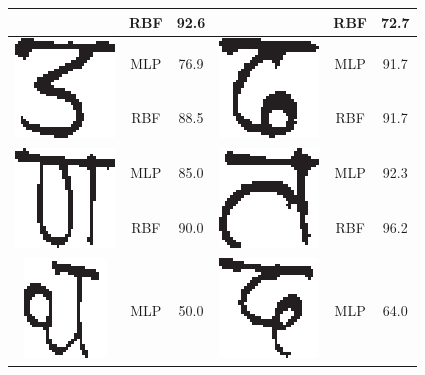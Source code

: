 \begin{table}[h]
\begin{tabular}{|c|c|c|c|c|c|}
\cline{2-3} \cline{5-6}
 & RBF & 92.6 &  & RBF & 72.7\tabularnewline
\hline
\multirow{2}{*}{\includegraphics[scale=0.25]{figures/datasets/nhcr/consonants/13da}} & MLP & 76.9 & \multirow{2}{*}{\includegraphics[scale=0.25]{figures/datasets/nhcr/consonants/14dha}} & MLP & 91.7\tabularnewline
\cline{2-3} \cline{5-6}
 & RBF & 88.5 &  & RBF & 91.7\tabularnewline
\hline
\multirow{2}{*}{\includegraphics[scale=0.25]{figures/datasets/nhcr/consonants/15yna}} & MLP & 85.0 & \multirow{2}{*}{\includegraphics[scale=0.25]{figures/datasets/nhcr/consonants/16ta}} & MLP & 92.3\tabularnewline
\cline{2-3} \cline{5-6}
 & RBF & 90.0 &  & RBF & 96.2\tabularnewline
\hline
\multirow{2}{*}{\includegraphics[scale=0.25]{figures/datasets/nhcr/consonants/17tha}} & MLP & 50.0 & \multirow{2}{*}{\includegraphics[scale=0.25]{figures/datasets/nhcr/consonants/18da}} & MLP & 64.0\tabularnewline

\end{tabular}
\end{table}
